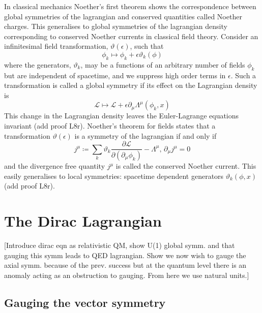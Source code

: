 \documentclass[11pt, a4paper]{article}
\theoremstyle{definition}
\theoremstyle{plain}
\begin{document}
In classical mechanics Noether's first theorem shows the correspondence between global symmetries of 
the lagrangian and conserved quantities called Noether charges. This generalises to global symmetries
of the lagrangian density corresponding to conserved Noether currents in classical field theory.
Consider an infinitesimal field transformation, $\vartheta(\epsilon)$, such that
\begin{equation}
  \phi_k \mapsto \phi_k + \epsilon\vartheta_k(\phi)
\end{equation}
where the generators, $\vartheta_k$, may be a functions of an arbitrary number of fields $\phi_k$ but
are independent of spacetime, and we suppress high order terms in $\epsilon$.
Such a transformation is called a global symmetry if its effect on the Lagrangian density is
\begin{equation}
  \mathcal{L} \mapsto \mathcal{L} + \epsilon\partial_\mu\Lambda^\mu(\phi_k, x)
\end{equation}
This change in the Lagrangian density leaves the Euler-Lagrange equations invariant (add proof L8r).
Noether's theorem for fields states that a transformation $\vartheta(\epsilon)$ is a symmetry
of the lagrangian if and only if 
\begin{equation}
  j^\mu \coloneq
  \sum_{k}{\vartheta_k \frac{\partial \mathcal{L}}{\partial (\partial_\mu \phi_k)}}
  - \Lambda^\mu, \, \partial_\mu j^\mu = 0 
\end{equation}
and the divergence free quantity $j^\mu$ is called the conserved Noether current.
This easily generalises to local symmetries: spacetime dependent generators
$\vartheta_k(\phi, x)$ (add proof L8r).

\section{The Dirac Lagrangian}
[Introduce dirac eqn as relativistic QM,
show U(1) global symm. and that gauging this symm leads to QED lagrangian.
Show we now wish to gauge the axial symm. because of the prev. success but 
at the quantum level there is an anomaly acting as an obstruction to gauging.
From here we use natural units.]

\subsection{Gauging the vector symmetry}
\end{document}
